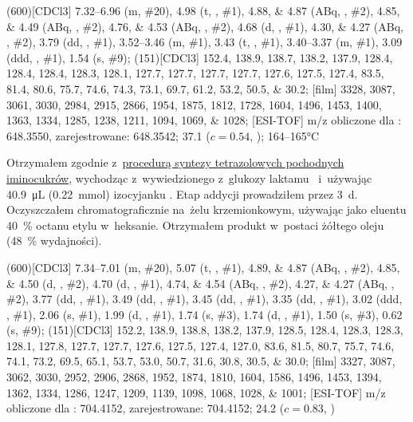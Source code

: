 \begin{fullexp}
  \NMR(600)[CDCl3] \numrange{7.32}{6.96} (m, \#{20}), \num{4.98} (t, , \#{1}), \numlist{4.88;4.87} (ABq, , \#{2}), \numlist{4.85;4.49} (ABq, , \#{2}), \numlist{4.76;4.53} (ABq, , \#{2}), \num{4.68} (d, , \#{1}), \numlist{4.30;4.27} (ABq, , \#{2}), \num{3.79} (dd, , \#{1}), \numrange{3.52}{3.46} (m, \#{1}), \num{3.43} (t, , \#{1}), \numrange{3.40}{3.37} (m, \#{1}), \num{3.09} (ddd, , \#{1}), \num{1.54} (s, \#{9});
  (151)[CDCl3] \numlist{152.4; 138.9; 138.7; 138.2; 137.9; 128.4; 128.4; 128.4; 128.3; 128.1; 127.7; 127.7; 127.7; 127.7; 127.6; 127.5; 127.4; 83.5; 81.4; 80.6; 75.7; 74.6; 74.3; 73.1; 69.7; 61.2; 53.2; 50.5; 30.2};
  [film] \numlist{3328; 3087; 3061; 3030; 2984; 2915; 2866; 1954; 1875; 1812; 1728; 1604; 1496; 1453; 1400; 1363; 1334; 1285; 1238; 1211; 1094; 1069; 1028};
  [ESI-TOF] m/z obliczone dla : \num{648.3550}, zarejestrowane: \num{648.3542};
  \data{[$\alpha^{23}_D$]~$=$} \num{37.1} ($c = 0.54$, );
   \numrange{164}{165}\si{\celsius}
\end{fullexp}

Otrzymałem zgodnie z~\hyperref[experimental:sugars:schwartz]{procedurą syntezy tetrazolowych
  pochodnych iminocukrów}, wychodząc z~wywiedzionego z~glukozy laktamu~
  i~używając \SI{40.9}{\micro\liter} (\SI{0.22}{\milli\mol}) izocyjanku .
Etap addycji prowadziłem przez \SI{3}{\day}.
Oczyszczałem chromatograficznie na~żelu krzemionkowym,
  używając jako eluentu \SI{40}{\percent} octanu etylu w~heksanie.
Otrzymałem produkt w~postaci żółtego oleju (\SI{48}{\percent} wydajności).

\begin{fullexp}
  \NMR(600)[CDCl3] \numrange{7.34}{7.01} (m, \#{20}), \num{5.07} (t, , \#{1}), \numlist{4.89;4.87} (ABq, , \#{2}), \numlist{4.85;4.50} (d, , \#{2}), \num{4.70} (d, , \#{1}), \numlist{4.74;4.54} (ABq, , \#{2}), \numlist{4.27;4.27} (ABq, , \#{2}), \num{3.77} (dd, , \#{1}), \num{3.49} (dd, , \#{1}), \num{3.45} (dd, , \#{1}), \num{3.35} (dd, , \#{1}), \num{3.02} (ddd, , \#{1}), \num{2.06} (s, \#{1}), \num{1.99} (d, , \#{1}), \num{1.74} (s, \#{3}), \num{1.74} (d, , \#{1}), \num{1.50} (s, \#{3}), \num{0.62} (s, \#{9});
  (151)[CDCl3] \numlist{152.2; 138.9; 138.8; 138.2; 137.9; 128.5; 128.4; 128.3; 128.3; 128.1; 127.8; 127.7; 127.7; 127.6; 127.5; 127.4; 127.0; 83.6; 81.5; 80.7; 75.7; 74.6; 74.1; 73.2; 69.5; 65.1; 53.7; 53.0; 50.7; 31.6; 30.8; 30.5; 30.0};
  [film] \numlist{3327; 3087; 3062; 3030; 2952; 2906; 2868; 1952; 1874; 1810; 1604; 1586; 1496; 1453; 1394; 1362; 1334; 1286; 1247; 1209; 1139; 1098; 1068; 1028; 1001};
  [ESI-TOF] m/z obliczone dla : \num{704.4152}, zarejestrowane: \num{704.4152};
  \data{[$\alpha^{23}_D$]~$=$} \num{24.2} ($c = 0.83$, )
\end{fullexp}

